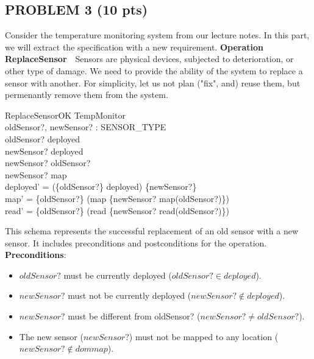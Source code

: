 \documentclass[12pt]{article}
\begin{document}
\begin{spacing}{1.5}
    \section*{PROBLEM 3 (10 pts)}

    Consider the temperature monitoring system from our lecture notes. In this part, we will extract the specification with a new requirement.
    \newline \newline
    \textbf{Operation ReplaceSensor}~~Sensors are physical devices, subjected to deterioration, or other type of damage. We need to provide the ability of the system to replace a sensor with another. For simplicity, let us not plan ("fix", and) reuse them, but permenantly remove them from the system.

    \begin{schema}{ReplaceSensorOK}
        \Delta TempMonitor \\
        oldSensor?, newSensor? : SENSOR\_TYPE \\
        \where
        oldSensor? \in deployed \\
        newSensor? \notin deployed \\
        newSensor? \neq oldSensor? \\
        newSensor? \notin \dom map \\
        deployed' = (\{oldSensor?\} \dsub deployed) \cup \{newSensor?\} \\
        map' = \{oldSensor?\} \dsub (map \oplus \{newSensor? \mapsto map(oldSensor?)\}) \\
        read' = \{oldSensor?\} \dsub (read \oplus \{newSensor? \mapsto read(oldSensor?)\})
    \end{schema}

    This schema represents the successful replacement of an old sensor with a new sensor. It includes preconditions and postconditions for the operation.\\

    \textbf{Preconditions}:
    \begin{itemize}
        \item $oldSensor?$ must be currently deployed ($oldSensor? \in deployed$).
        \item $newSensor?$ must not be currently deployed ($newSensor? \notin deployed$).
        \item $newSensor?$ must be different from oldSensor? ($newSensor? \neq oldSensor?$).
        \item The new sensor ($newSensor?$) must not be mapped to any location ($newSensor? \notin dom map$).
    \end{itemize}


\end{spacing}
\end{document}
